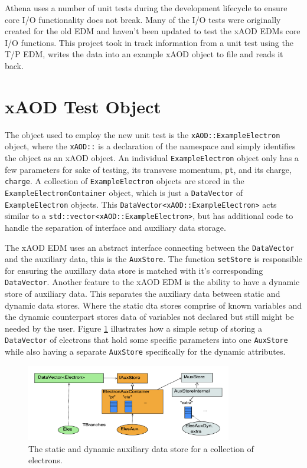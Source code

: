 Athena uses a number of unit tests during the development lifecycle to ensure core I/O functionality does not break.
Many of the I/O tests were originally created for the old EDM and haven't been updated to test the xAOD EDMs core I/O functions.
This project took in track information from a unit test using the T/P EDM, writes the data into an example xAOD object to file and reads it back.


\section{xAOD Test Object}
\label{sec:Mod_utests_xAOD_object}

The object used to employ the new unit test is the \verb|xAOD::ExampleElectron| object, where the \verb|xAOD::| is a declaration of the namespace and simply identifies the object as an xAOD object.
An individual \verb|ExampleElectron| object only has a few parameters for sake of testing, its transvese momentum, \verb|pt|, and its charge, \verb|charge|.
A collection of \verb|ExampleElectron| objects are stored in the \verb|ExampleElectronContainer| object, which is just a \verb|DataVector| of \verb|ExampleElectron| objects.\cite{Buckley_2015}
This \verb|DataVector<xAOD::ExampleElectron>| acts similar to a \verb|std::vector<xAOD::ExampleElectron>|, but has additional code to handle the separation of interface and auxiliary data storage. 


The xAOD EDM uses an abstract interface connecting between the \verb|DataVector| and the auxiliary data, this is the \verb|AuxStore|. 
The function \verb|setStore| is responsible for ensuring the auxillary data store is matched with it's corresponding \verb|DataVector|.
Another feature to the xAOD EDM is the ability to have a dynamic store of auxiliary data.
This separates the auxiliary data between static and dynamic data stores. 
Where the static dta stores comprise of known variables and the dynamic counterpart stores data of variables not declared but still might be needed by the user. 
Figure \ref{fig:Mod_utests_aux_store} illustrates how a simple setup of storing a \verb|DataVector| of electrons that hold some specific parameters into one \verb|AuxStore| while also having a separate \verb|AuxStore| specifically for the dynamic attributes. 

\begin{figure}[h]
    \centering
    \includegraphics[width=0.8\textwidth]{content/img/auxstore.png}
    \caption{The static and dynamic auxiliary data store for a collection of electrons.}
    \label{fig:Mod_utests_aux_store}
\end{figure}



